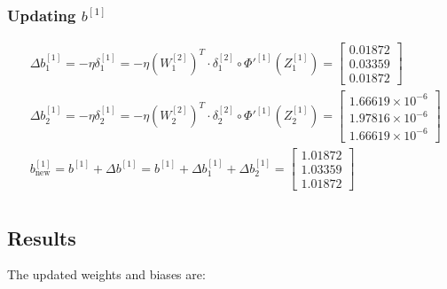 \documentclass{article}
\begin{document}
\subsubsection*{Updating $b^{[1]}$}

\begin{align*}
    &\Delta b^{[1]}_1 = - \eta \delta^{[1]}_1 = - \eta (W^{[2]}_1)^T \cdot \delta^{[2]}_1 \circ \Phi'^{[1]}(Z^{[1]}_1) = \begin{bmatrix} 0.01872 \\  0.03359 \\  0.01872\end{bmatrix} \\
    &\Delta b^{[1]}_2 = - \eta \delta^{[1]}_2 = - \eta (W^{[2]}_2)^T \cdot \delta^{[2]}_2 \circ \Phi'^{[1]}(Z^{[1]}_2) = \begin{bmatrix} 1.66619\times 10^{-6} \\  1.97816\times 10^{-6} \\  1.66619\times 10^{-6}\end{bmatrix} \\
    &b^{[1]}_{\text{new}} = b^{[1]} + \Delta b^{[1]} = b^{[1]} + \Delta b^{[1]}_1 + \Delta b^{[1]}_2 = \begin{bmatrix} 1.01872 \\  1.03359 \\  1.01872\end{bmatrix} \\
\end{align*}

\subsection*{Results}

The updated weights and biases are:
\end{document}
